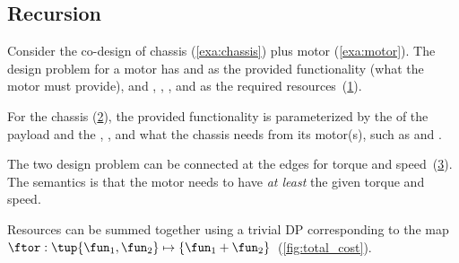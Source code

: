 \FloatBarrier\vfill\clearpage %

\subsection{Recursion}

\begin{example}
    \label{exa:chassis_plus_motor}
    Consider the co-design of chassis (\cref{exa:chassis}) plus motor (\cref{exa:motor}).
    The design problem for a motor has  and  as the provided functionality (what the motor must provide), and , , , and  as the required resources~(\cref{fig:motor}).

    \begin{figure}[h!]
        \centering
        \caption{}
        \label{fig:motor}
    \end{figure}

    For the chassis (\cref{fig:gmcdp_chassis}), the provided functionality is parameterized by the  of the payload and the , , and what the chassis needs from its motor(s), such as  and .

    \begin{figure}[h!]
        \centering
        \caption{}
        \label{fig:gmcdp_chassis}
    \end{figure}

    The two design problem can be connected at the edges for torque and speed~(\cref{fig:gmcdp_chassis_plus_motor_series}).
    The semantics is that the motor needs to have \emph{at least} the given torque and speed.


    \begin{figure}[h!]
        \centering
        \caption{}
        \label{fig:gmcdp_chassis_plus_motor_series}
    \end{figure}

    Resources can be summed together using a trivial DP corresponding to the map $\ftor:\tup{\fun_{1},\fun_{2}} \mapsto\{\fun_{1}+\fun_{2}\}$~(\cref{fig:total_cost}).


\end{example}
